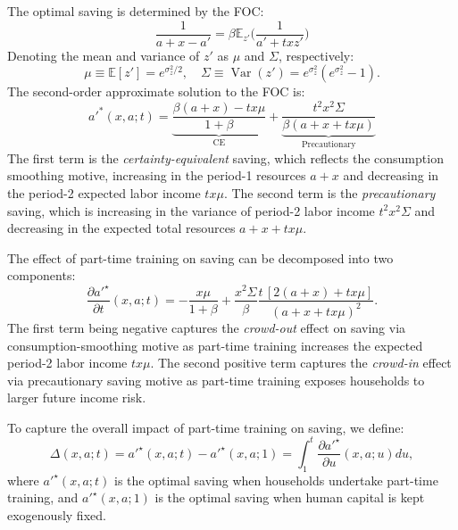 \documentclass[12pt]{article}
\begin{document}
The optimal saving is determined by the FOC:
\begin{equation}
\frac{1}{a+x-a'} = \beta\mathbb{E}_{z'}\big(\frac{1}{a'+txz'}\big)
\end{equation}
Denoting the mean and variance of $z'$ as $\mu$ and $\Sigma$, respectively:
\begin{equation}
    \mu \equiv \mathbb{E}[z'] = e^{\sigma_z^2/2}, \quad \Sigma \equiv\operatorname{Var}(z') = e^{\sigma_z^2}(e^{\sigma_z^2}-1).
\end{equation}
The second-order approximate solution to the FOC is:
\begin{equation}
a'^*(x,a;t) = \underbrace{\frac{\beta(a+x) - tx\mu}{1+\beta}}_{\text{CE}} + \underbrace{\frac{t^2x^2\Sigma}{\beta(a+x + tx\mu)}}_{\text{Precautionary}}
\end{equation}
The first term is the \textit{certainty-equivalent} saving, which reflects the consumption smoothing motive, increasing in the period-1 resources $a+x$ and decreasing in the period-2 expected labor income $tx\mu$. The second term is the \textit{precautionary} saving, which is increasing in the variance of period-2 labor income $t^2x^2\Sigma$ and decreasing in the expected total resources $a+x+tx\mu$.

The effect of part-time training on saving can be decomposed into two components:
\begin{equation}
    \frac{\partial a'^\star}{\partial t}(x,a;t)
    = -\frac{x\mu}{1+\beta}+\frac{x^2 \Sigma}{\beta}\frac{t\,[2(a+x) + t x \mu]}{(a+x + t x \mu)^2}.
    \label{eq:dadt_partial}
\end{equation}
The first term being negative captures the \textit{crowd-out} effect on saving via consumption-smoothing motive as part-time training increases the expected period-2 labor income $tx\mu$. The second positive term captures the \textit{crowd-in} effect via precautionary saving motive as part-time training exposes households to larger future income risk.

To capture the overall impact of part-time training on saving, we define:
\begin{equation} \label{eq:dadt_integral}
    \Delta(x,a;t) = a'^\star(x,a;t) - a'^\star(x,a;1) = \int_1^t \frac{\partial a'^\star}{\partial u}(x,a;u) du,
\end{equation}
where $a'^\star(x,a;t)$ is the optimal saving when households undertake part-time training, and $a'^\star(x,a;1)$ is the optimal saving when human capital is kept exogenously fixed. 
\end{document}
